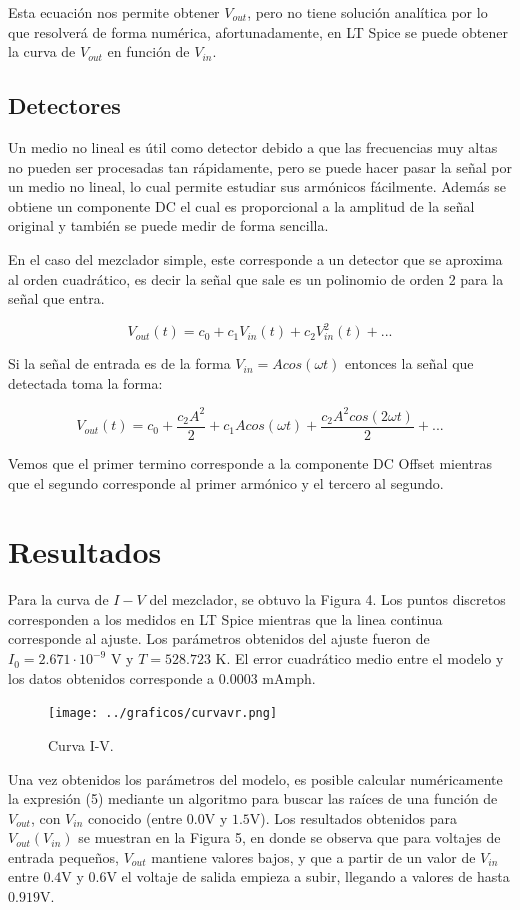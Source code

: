 \documentclass[letterpaper,oneside]{article}
\begin{document}
Esta ecuación nos permite obtener $V_{out}$, pero no tiene solución analítica por lo que resolverá de forma numérica, afortunadamente, en LT Spice se puede obtener la curva de $V_{out}$ en función de $V_{in}$. 

\subsection{Detectores}
Un medio no lineal es útil como detector debido a que las frecuencias muy altas no pueden ser procesadas tan rápidamente, pero se puede hacer pasar la señal por un medio no lineal, lo cual permite estudiar sus armónicos fácilmente. Además se obtiene un componente DC el cual es proporcional a la amplitud de la señal original y también se puede medir de forma sencilla. 

En el caso del mezclador simple, este corresponde a un detector que se aproxima al orden cuadrático, es decir la señal que sale es un polinomio de orden 2 para la señal que entra.

$$V_{out} (t) = c_0 + c_1V_{in}(t) + c_2V_{in}^2(t) + ...$$

Si la señal de entrada es de la forma $V_{in}=Acos(\omega t)$ entonces la señal que detectada toma la forma:

$$V_{out}(t) = c_0 + \frac{c_2 A^2}{2} + c_1 A cos(\omega t) + \frac{c_2 A^2 cos(2 \omega t)}{2} + ...$$

Vemos que el primer termino corresponde a la componente DC Offset mientras que el segundo corresponde al primer armónico y el tercero al segundo.


\section{Resultados}

Para la curva de $I-V$ del mezclador, se obtuvo la Figura 4. Los puntos discretos corresponden a los medidos en LT Spice mientras que la linea continua corresponde al ajuste. Los parámetros obtenidos del ajuste fueron de  $I_0= 2.671 \cdot 10^{-9}$ V y $T = 528.723$ K. El error cuadrático medio entre el modelo y los datos obtenidos corresponde a $0.0003$ mAmph. 

\begin{figure}
  \centering
  \texttt{[image: ../graficos/curvavr.png]}
  \caption{Curva I-V.}
\end{figure}

Una vez obtenidos los parámetros del modelo, es posible calcular numéricamente la expresión (5) mediante un algoritmo para buscar las raíces de una función de $V_{out}$, con $V_{in}$ conocido (entre $0.0$V y $1.5$V). Los resultados obtenidos para $V_{out}(V_{in})$ se muestran en la Figura 5, en donde se observa que para voltajes de entrada pequeños, $V_{out}$ mantiene valores bajos, y que a partir de un valor de $V_{in}$ entre $0.4$V y $0.6$V el voltaje de salida empieza a subir, llegando a valores de hasta $0.919$V.
\end{document}
